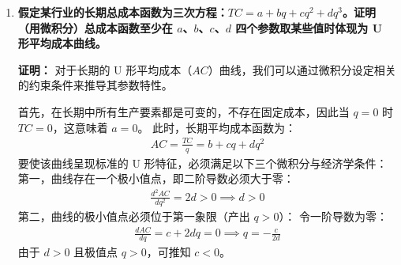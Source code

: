 \begin{enumerate}[label=\textbf{\arabic*.}, leftmargin=*]
		（2）存在规模不经济。
		规模经济的判定取决于当期边际成本（$MC$）与平均成本（$AC$）的相对大小关系（即成本产出弹性 $E_c = MC/AC$）。
		已知当期总成本 $TC = AC \cdot q = 10q - 0.1Qq + 0.3q^2$，对其求当期产量 $q$ 的导数可得边际成本：
		\[
		\begin{aligned}
			MC = \frac{\partial TC}{\partial q} = 10 - 0.1Q + 0.6q
		\end{aligned}
		\]
		将边际成本与平均成本进行比较：
		\[
		\begin{aligned}
			MC - AC &= (10 - 0.1Q + 0.6q) - (10 - 0.1Q + 0.3q) \\
			&= 0.3q
		\end{aligned}
		\]
		由于工厂的实际产出 $q > 0$，因此必定有 $MC > AC$，即成本产出弹性 $E_c > 1$。这说明生产扩张带来的边际成本增量高于当前的平均成本，存在规模不经济。
		
		（3）公司的平均生产成本会下降。
		根据题意，$Q$ 和 $q$ 的单位均为千台。
		今年，公司的累积产量为 $Q_1 = 40$，当期产量为 $q_1 = 10$。今年的平均成本为：
		\[
		\begin{aligned}
			AC_1 = 10 - 0.1 \times 40 + 0.3 \times 10 = 10 - 4 + 3 = 9 \text{（千美元/千台）}
		\end{aligned}
		\]
		明年初，累积产量变为 $Q_2 = 40 + 10 = 50$。明年计划的当期产量为 $q_2 = 12$。明年的预期平均成本为：
		\[
		\begin{aligned}
			AC_2 = 10 - 0.1 \times 50 + 0.3 \times 12 = 10 - 5 + 3.6 = 8.6 \text{（千美元/千台）}
		\end{aligned}
		\]
		尽管扩大当期规模带来了规模不经济（导致单位成本承受了 $0.6$ 的上行压力），但由于这一年间积累了 10000 台的生产经验，强大的学习曲线效应（带来了 $1.0$ 的下行拉力）抵消并主导了成本走向，最终使平均成本由 9 下降至 8.6。
		
		\item \textbf{假定某行业的长期总成本函数为三次方程：$TC = a + bq + cq^2 + dq^3$。证明（用微积分）总成本函数至少在 $a$、$b$、$c$、$d$ 四个参数取某些值时体现为 U 形平均成本曲线。}
		
		\textbf{证明：}
		对于长期的 U 形平均成本（$AC$）曲线，我们可以通过微积分设定相关的约束条件来推导其参数特性。
		
		首先，在长期中所有生产要素都是可变的，不存在固定成本，因此当 $q=0$ 时 $TC=0$，这意味着 $a = 0$。
		此时，长期平均成本函数为：
		\[
		\begin{aligned}
			AC = \frac{TC}{q} = b + cq + dq^2
		\end{aligned}
		\]
		要使该曲线呈现标准的 U 形特征，必须满足以下三个微积分与经济学条件：
		第一，曲线存在一个极小值点，即二阶导数必须大于零：
		\[
		\begin{aligned}
			\frac{d^2 AC}{dq^2} = 2d > 0 \implies d > 0
		\end{aligned}
		\]
		第二，曲线的极小值点必须位于第一象限（产出 $q > 0$）：
		令一阶导数为零：
		\[
		\begin{aligned}
			\frac{dAC}{dq} = c + 2dq = 0 \implies q = -\frac{c}{2d}
		\end{aligned}
		\]
		由于 $d > 0$ 且极值点 $q > 0$，可推知 $c < 0$。
		

\end{enumerate}
